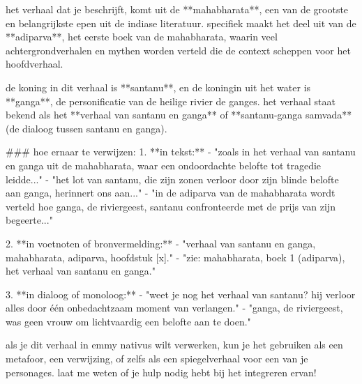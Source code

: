 het verhaal dat je beschrijft, komt uit de **mahabharata**, een van de grootste en belangrijkste epen uit de indiase literatuur. specifiek maakt het deel uit van de **adiparva**, het eerste boek van de mahabharata, waarin veel achtergrondverhalen en mythen worden verteld die de context scheppen voor het hoofdverhaal.

de koning in dit verhaal is **santanu**, en de koningin uit het water is **ganga**, de personificatie van de heilige rivier de ganges. het verhaal staat bekend als het **verhaal van santanu en ganga** of **santanu-ganga samvada** (de dialoog tussen santanu en ganga).

\#\#\# hoe ernaar te verwijzen:
1. **in tekst:**
- "zoals in het verhaal van santanu en ganga uit de mahabharata, waar een ondoordachte belofte tot tragedie leidde..."
- "het lot van santanu, die zijn zonen verloor door zijn blinde belofte aan ganga, herinnert ons aan..."
- "in de adiparva van de mahabharata wordt verteld hoe ganga, de riviergeest, santanu confronteerde met de prijs van zijn begeerte..."

2. **in voetnoten of bronvermelding:**
- "verhaal van santanu en ganga, mahabharata, adiparva, hoofdstuk [x]."
- "zie: mahabharata, boek 1 (adiparva), het verhaal van santanu en ganga."

3. **in dialoog of monoloog:**
- "weet je nog het verhaal van santanu? hij verloor alles door één onbedachtzaam moment van verlangen."
- "ganga, de riviergeest, was geen vrouw om lichtvaardig een belofte aan te doen."

als je dit verhaal in emmy nativus wilt verwerken, kun je het gebruiken als een metafoor, een verwijzing, of zelfs als een spiegelverhaal voor een van je personages. laat me weten of je hulp nodig hebt bij het integreren ervan!

